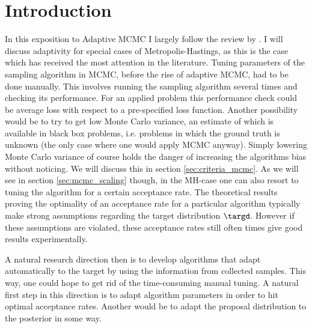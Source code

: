 \newcommand{\sfact}{\mathcal{L}} %
\newcommand{\speed}{\mathcal{S}} %

\section{Introduction}
In this exposition to Adaptive MCMC I largely follow the review by \cite{Rosenthal2011}. I will discuss adaptivity for special cases of Metropolis-Hastings, as this is the case which has received the most attention in the literature. Tuning parameters of the sampling algorithm in MCMC, before the rise of adaptive MCMC, had to be done manually. This involves running the sampling algorithm several times and checking its performance. For an applied problem this performance check could be average loss with respect to a pre-specified loss function. Another possibility would be to try to get low Monte Carlo variance, an estimate of which is available in black box problems, i.e. problems in which the ground truth is unknown (the only case where one would apply MCMC anyway). Simply lowering Monte Carlo variance of course holds the danger of increasing the algorithms bias without noticing. We will discuss this in section \ref{sec:criteria_mcmc}.
As we will see in section \ref{sec:mcmc_scaling} though, in the MH-case one can also resort to tuning the algorithm for a certain acceptance rate. The theoretical results proving the optimality of an acceptance rate for a particular algorithm typically make strong assumptions regarding the target distribution $\targd$. However if these assumptions are violated, these acceptance rates still often times give good results experimentally.

A natural research direction then is to develop algorithms that adapt automatically to the target by using the information from collected samples. This way, one could hope to get rid of the time-consuming manual tuning. A natural first step in this direction is to adapt algorithm parameters in order to hit optimal acceptance rates. Another would be to adapt the proposal distribution to the posterior in some way.

